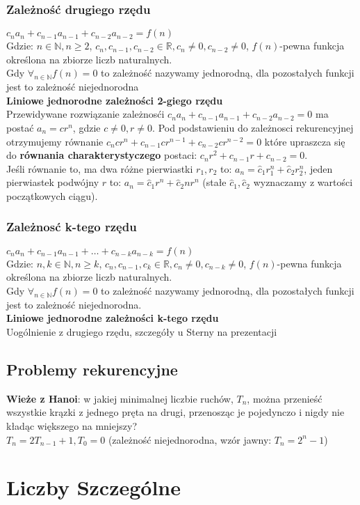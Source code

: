 \documentclass[a4paper,12pt]{article}
\begin{document}
\subsubsection{Zależność drugiego rzędu}
$c_na_n+c_{n-1}a_{n-1}+c_{n-2}a_{n-2}=f(n)$\\
Gdzie: $n\in\mathbb{N}, n\geq2$, $c_n,c_{n-1}, c_{n-2}\in\mathbb{R}, c_n\neq0, c_{n-2}\neq0$, $f(n)$-pewna funkcja określona na zbiorze liczb naturalnych.\\
Gdy $\forall_{n \in\mathbb{N}}f(n)=0$ to zależność nazywamy jednorodną, dla pozostałych funkcji  jest to zależność niejednorodna \\
\textbf{Liniowe jednorodne zależności 2-giego rzędu}\\
Przewidywane rozwiązanie zależnosći $c_na_n+c_{n-1}a_{n-1}+c_{n-2}a_{n-2}=0$ ma postać $a_n=cr^n$, gdzie $c\neq0, r\neq0$. Pod podstawieniu do zależnosci rekurencyjnej otrzymujemy równanie $c_ncr^n+c_{n-1}cr^{n-1}+c_{n-2}cr^{n-2}=0$ które upraszcza się do \textbf{równania charakterystyczego} postaci: $c_nr^2+c_{n-1}r+c_{n-2}=0$.\\
Jeśli równanie to, ma dwa różne pierwiastki $r_1, r_2$ to: $a_n=\hat c_1r_1^n+\hat c_2r_2^n$, jeden pierwiastek podwójny $r$ to: $a_n=\hat c_1r^n+\hat c_2nr^n$ (stałe $\hat c_1, \hat c_2$ wyznaczamy z wartości początkowych ciągu).
\subsubsection{Zależnosć k-tego rzędu}
$c_na_n+c_{n-1}a_{n-1}+\dots + c_{n-k}a_{n-k}=f(n)$\\
Gdzie: $n,k\in\mathbb{N}, n\geq k$, $c_n,c_{n-1}, c_k\in\mathbb{R}, c_n\neq0, c_{n-k}\neq0$, $f(n)$-pewna funkcja określona na zbiorze liczb naturalnych.\\
Gdy $\forall_{n \in\mathbb{N}}f(n)=0$ to zależność nazywamy jednorodną, dla pozostałych funkcji  jest to zależność niejednorodna. \\
\textbf{Liniowe jednorodne zależności k-tego rzędu}\\
Uogólnienie z drugiego rzędu, szczegóły u Sterny na prezentacji
\subsection{Problemy rekurencyjne}
\textbf{Wieże z Hanoi}: w jakiej minimalnej liczbie ruchów, $T_n$, można przenieść wszystkie krązki z jednego pręta na drugi, przenosząc je pojedynczo i nigdy nie kładąc większego na mniejszy?\\
$T_n=2T_{n-1}+1, T_0=0$ (zależność niejednorodna, wzór jawny: $T_n=2^n-1$)
\section{Liczby Szczególne}
\end{document}
